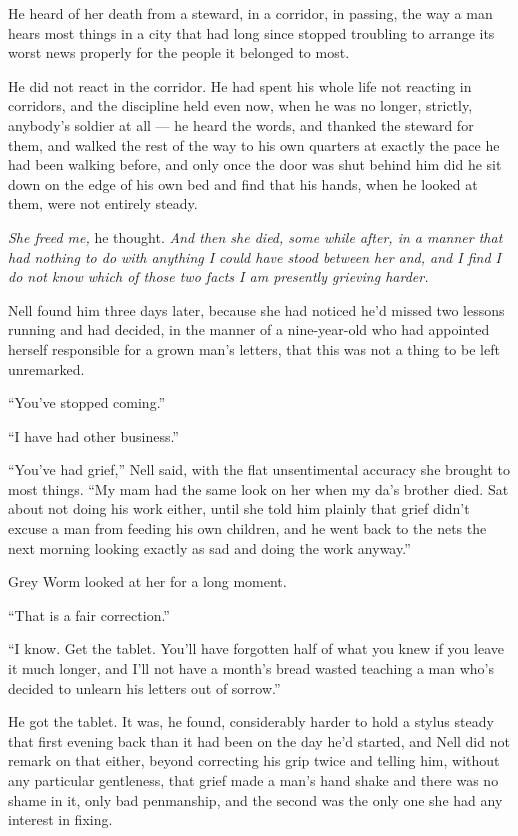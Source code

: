 He heard of her death from a steward, in a corridor, in passing, the way a man hears most things in a city that had long since stopped troubling to arrange its worst news properly for the people it belonged to most.

He did not react in the corridor. He had spent his whole life not reacting in corridors, and the discipline held even now, when he was no longer, strictly, anybody’s soldier at all — he heard the words, and thanked the steward for them, and walked the rest of the way to his own quarters at exactly the pace he had been walking before, and only once the door was shut behind him did he sit down on the edge of his own bed and find that his hands, when he looked at them, were not entirely steady.

\textit{She freed me,} he thought. \textit{And then she died, some while after, in a manner that had nothing to do with anything I could have stood between her and, and I find I do not know which of those two facts I am presently grieving harder.}

\sceneBreak

Nell found him three days later, because she had noticed he’d missed two lessons running and had decided, in the manner of a nine-year-old who had appointed herself responsible for a grown man’s letters, that this was not a thing to be left unremarked.

“You’ve stopped coming.”

“I have had other business.”

“You’ve had grief,” Nell said, with the flat unsentimental accuracy she brought to most things. “My mam had the same look on her when my da’s brother died. Sat about not doing his work either, until she told him plainly that grief didn’t excuse a man from feeding his own children, and he went back to the nets the next morning looking exactly as sad and doing the work anyway.”

Grey Worm looked at her for a long moment.

“That is a fair correction.”

“I know. Get the tablet. You’ll have forgotten half of what you knew if you leave it much longer, and I’ll not have a month’s bread wasted teaching a man who’s decided to unlearn his letters out of sorrow.”

He got the tablet. It was, he found, considerably harder to hold a stylus steady that first evening back than it had been on the day he’d started, and Nell did not remark on that either, beyond correcting his grip twice and telling him, without any particular gentleness, that grief made a man’s hand shake and there was no shame in it, only bad penmanship, and the second was the only one she had any interest in fixing.

